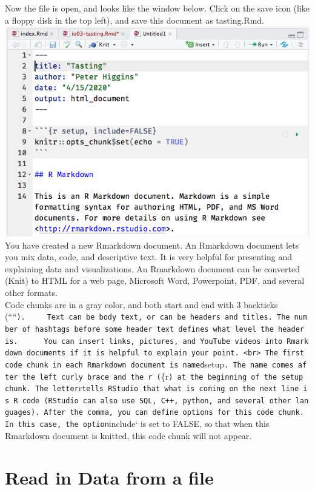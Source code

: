 \documentclass[]{book}
\begin{document}
Now the file is open, and looks like the window below. Click on the save icon (like a floppy disk in the top left), and save this document as tasting.Rmd.
\includegraphics{images/newrmd3.png}
You have created a new Rmarkdown document. An Rmarkdown document lets you mix data, code, and descriptive text. It is very helpful for presenting and explaining data and visualizations. An Rmarkdown document can be converted (Knit) to HTML for a web page, Microsoft Word, Powerpoint, PDF, and several other formats.\\
Code chunks are in a gray color, and both start and end with 3 backticks (````\texttt{).\ \ \ \ \ Text\ can\ be\ body\ text,\ or\ can\ be\ headers\ and\ titles.\ The\ number\ of\ hashtags\ before\ some\ header\ text\ defines\ what\ level\ the\ header\ is.\ \ \ \ \ \ You\ can\ insert\ links,\ pictures,\ and\ YouTube\ videos\ into\ Rmarkdown\ documents\ if\ it\ is\ helpful\ to\ explain\ your\ point.\ \textless{}br\textgreater{}\ The\ first\ code\ chunk\ in\ each\ Rmarkdown\ document\ is\ named}setup\texttt{.\ The\ name\ comes\ after\ the\ left\ curly\ brace\ and\ the\ r\ (}\{r\texttt{)\ at\ the\ beginning\ of\ the\ setup\ chunk.\ The\ letter}r\texttt{tells\ RStudio\ that\ what\ is\ coming\ on\ the\ next\ line\ is\ R\ code\ (RStudio\ can\ also\ use\ SQL,\ C++,\ python,\ and\ several\ other\ languages).\ After\ the\ comma,\ you\ can\ define\ options\ for\ this\ code\ chunk.\ In\ this\ case,\ the\ option}include` is set to FALSE, so that when this Rmarkdown document is knitted, this code chunk will not appear.

\hypertarget{read-in-data-from-a-file}{%
\section{Read in Data from a file}\label{read-in-data-from-a-file}}
\end{document}
